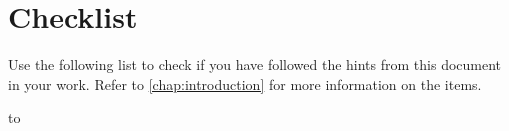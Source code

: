 \chapter{Checklist}
\label{chap:appendix:checklist}
Use the following list to check if you have followed the hints from this document in your work.
Refer to \cref{chap:introduction} for more information on the items.

\tabulinesep=2.5mm
\begin{longtabu} to \textwidth {|X[1]|X[17]|X[2]|}
\caption[Formatting checklist]{The checklist for correctly formatted and prettier documents.}
\label{tab:checklist}
\\
\hline
\endfirsthead

\caption[]{Table continued.}
\\
\hline
\endhead

 \\
\endfoot

\endlastfoot


\end{longtabu}
